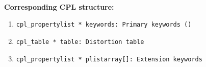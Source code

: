 \paragraph{\hyperref[dataitem:ifu_dist_reduced]{}}\label{drsstructure:IFU_DIST_REDUCED}
\begin{datastructdef}
\textbf{Corresponding \ac{CPL} structure:}
\begin{enumerate}
    \item \texttt{cpl\_propertylist * keywords: Primary keywords (\hyperref[fits:pro.catg]{})}
    \item \texttt{cpl\_table * table: Distortion table}
    \item \texttt{cpl\_propertylist * plistarray[]: Extension keywords}
\end{enumerate}
\end{datastructdef}

